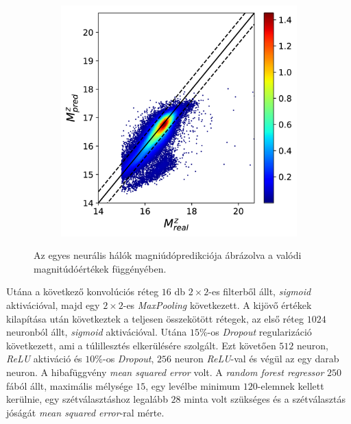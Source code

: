 \documentclass[12pt,letterpaper,oneside,openright]{book}
\begin{document}
\begin{figure}[]
\begin{subfigure}[b]{0.3\textwidth}
    \label{fig:2}
    \hspace{0cm}
  \end{subfigure}
   \begin{subfigure}[b]{0.3\textwidth}
    \includegraphics[width=\textwidth, height = \textwidth]{Figures/pmz3.png}
    \label{fig:2}
    
  \end{subfigure}

\caption{Az egyes neurális hálók magniúdópredikciója ábrázolva a valódi magnitúdóértékek függényében.}
\label{mags}
\end{figure}
 Utána a következő konvolúciós réteg $16$ db $2\times 2$-es filterből állt,  \textit{sigmoid} aktivációval, majd egy $2\times 2$-es \textit{MaxPooling} következett. A kijövő értékek kilapítása után következtek a teljesen összekötött rétegek, az első réteg $1024$ neuronból állt, \textit{sigmoid} aktivációval. Utána  $15\%$-os \textit{Dropout} regularizáció következett, ami a túlillesztés elkerülésére szolgált. Ezt követően $512$ neuron, \textit{ReLU} aktiváció és $10\%$-os \textit{Dropout}, $256$ neuron \textit{ReLU}-val és végül az egy darab neuron. A hibafüggvény \textit{mean squared error} volt. A \textit{random forest regressor} $250$ fából állt, maximális mélysége $15$, egy levélbe minimum $120$-elemnek kellett kerülnie, egy szétválasztáshoz legalább $28$ minta volt szükséges és a szétválasztás jóságát \textit{mean squared error}-ral mérte. \newline\indent
\end{document}
